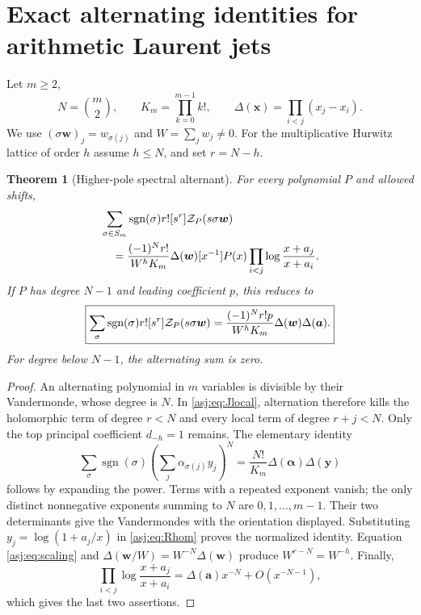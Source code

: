 \documentclass[11pt]{article}
\numberwithin{equation}{section}
\newtheorem{theorem}{Theorem}[section]
\theoremstyle{definition}\newtheorem{definition}[theorem]{Definition}
\theoremstyle{remark}\newtheorem{remark}[theorem]{Remark}\newtheorem{example}[theorem]{Example}
\begin{document}


\section{Exact alternating identities for arithmetic Laurent jets}
\label{asj:sec:alternants}

Let $m\ge2$,
\[
 N=\binom m2,\qquad K_m=\prod_{k=0}^{m-1}k!,\qquad
 \Delta(\boldsymbol x)=\prod_{i<j}(x_j-x_i).
\]
We use $(\sigma\boldsymbol w)_j=w_{\sigma(j)}$ and
$W=\sum_jw_j\ne0$. For the multiplicative Hurwitz lattice of order $h$
assume $h\le N$, and set $r=N-h$.

\begin{theorem}[Higher-pole spectral alternant]\label{asj:thm:alternant}
For every polynomial $P$ and allowed shifts,
\begin{align}\label{asj:eq:alternant}
 &\sum_{\sigma\in S_m}\operatorname{sgn}(\sigma)
           r![s^r]\mathcal Z_P(s\sigma\boldsymbol w)\notag\\
 &\quad=\frac{(-1)^N r!}{W^h K_m}\Delta(\boldsymbol w)
          [x^{-1}]P(x)\prod_{i<j}\log\frac{x+a_j}{x+a_i}.
\end{align}
If $P$ has degree $N-1$ and leading coefficient $p$, this reduces to
\begin{equation}\label{asj:eq:alternant-leading}
 \boxed{\displaystyle
 \sum_{\sigma}\operatorname{sgn}(\sigma)
           r![s^r]\mathcal Z_P(s\sigma\boldsymbol w)
  =\frac{(-1)^N r!p}{W^hK_m}
                \Delta(\boldsymbol w)\Delta(\boldsymbol a).}
\end{equation}
For degree below $N-1$, the alternating sum is zero.
\end{theorem}
\begin{proof}
An alternating polynomial in $m$ variables is divisible by their
Vandermonde, whose degree is $N$. In \eqref{asj:eq:Jlocal}, alternation
therefore kills the holomorphic term of degree $r<N$ and every local
term of degree $r+j<N$. Only the top principal coefficient $d_{-h}=1$
remains. The elementary identity
\begin{equation}\label{asj:eq:elementary-alternant}
 \sum_{\sigma}\operatorname{sgn}(\sigma)
       \left(\sum_j\alpha_{\sigma(j)}y_j\right)^N
       =\frac{N!}{K_m}\Delta(\boldsymbol\alpha)\Delta(\boldsymbol y)
\end{equation}
follows by expanding the power. Terms with a repeated exponent vanish;
the only distinct nonnegative exponents summing to $N$ are
$0,1,\ldots,m-1$. Their two determinants give the Vandermondes with the
orientation displayed. Substituting $y_j=\log(1+a_j/x)$ in
\eqref{asj:eq:Rhom} proves the normalized identity. Equation
\eqref{asj:eq:scaling} and $\Delta(\boldsymbol w/W)=W^{-N}\Delta(\boldsymbol w)$
produce $W^{r-N}=W^{-h}$. Finally,
\[
 \prod_{i<j}\log\frac{x+a_j}{x+a_i}
         =\Delta(\boldsymbol a)x^{-N}+O(x^{-N-1}),
\]
which gives the last two assertions.
\end{proof}
\end{document}
